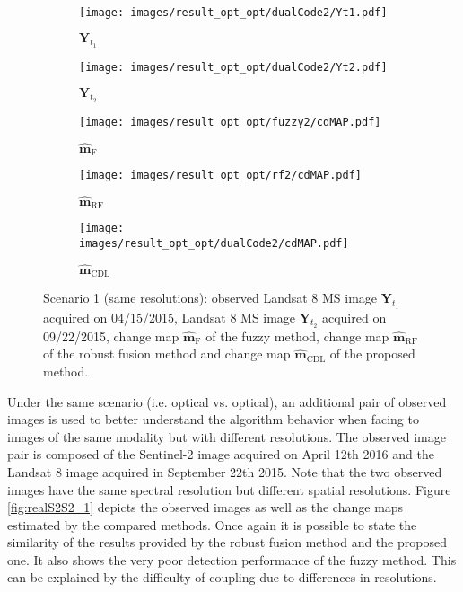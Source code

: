 \documentclass[review]{elsarticle}
\begin{document}
\newcommand{\subfwidth}{0.49\columnwidth}
\newcommand{\figsize}{1\columnwidth}

\begin{figure}[h!]
\centering
			\begin{subfigure}{\subfwidth}
					\centering
					\texttt{[image: images/result\_opt\_opt/dualCode2/Yt1.pdf]}
					\caption{$\mathbf{Y}_{t_1}$}
					\label{fig:s2s2Yt1_2}
			\end{subfigure}
			\begin{subfigure}{\subfwidth}
					\centering
					\texttt{[image: images/result\_opt\_opt/dualCode2/Yt2.pdf]}
					\caption{$\mathbf{Y}_{t_2}$}
					\label{fig:s2s2Yt2_2}
			\end{subfigure}
			\begin{subfigure}{\subfwidth}
					\centering
					\texttt{[image: images/result\_opt\_opt/fuzzy2/cdMAP.pdf]}
					\caption{$\hat{\mathbf{m}}_{\mathrm{F}}$}
					\label{fig:s2s2FMAP_2}
			\end{subfigure}
            \begin{subfigure}{\subfwidth}
					\centering
					\texttt{[image: images/result\_opt\_opt/rf2/cdMAP.pdf]}
					\caption{$\hat{\mathbf{m}}_{\mathrm{RF}}$}
					\label{fig:s2s2RFMAP_2}
			\end{subfigure}
            \begin{subfigure}{\subfwidth}
					\centering
					\texttt{[image: images/result\_opt\_opt/dualCode2/cdMAP.pdf]}
					\caption{$\hat{\mathbf{m}}_{\mathrm{CDL}}$}
					\label{fig:s2s2DCMAP_2}
			\end{subfigure}
\caption{Scenario 1 (same resolutions): \protect{}  observed  Landsat 8 MS image $\mathbf{Y}_{t_1}$ acquired on 04/15/2015, \protect{}  Landsat 8 MS image $\mathbf{Y}_{t_2}$  acquired on 09/22/2015, \protect{} change map $\hat{\mathbf{m}}_{\mathrm{F}}$ of the fuzzy method, \protect{} change map $\hat{\mathbf{m}}_{\mathrm{RF}}$ of the robust fusion method
	 and \protect{} change map $\hat{\mathbf{m}}_{\mathrm{CDL}}$ of the proposed method.}%
	\label{fig:realS2S2_2}%
\end{figure}

Under the same scenario (i.e. optical vs. optical), an additional pair of observed images is used to better understand the algorithm behavior when facing to images of the same modality but with different resolutions. The observed image pair is composed of the Sentinel-2 image acquired on April 12th 2016 and the Landsat 8 image acquired in September 22th 2015. Note that the two observed images have the same spectral resolution but different spatial resolutions. Figure \ref{fig:realS2S2_1} depicts the observed images as well as the change maps estimated by the compared methods. Once again it is possible to state the similarity of the results provided by the robust fusion method and the proposed one. It also shows the very poor detection performance of the fuzzy method. This can be explained by the difficulty of coupling due to differences in resolutions.
\end{document}
